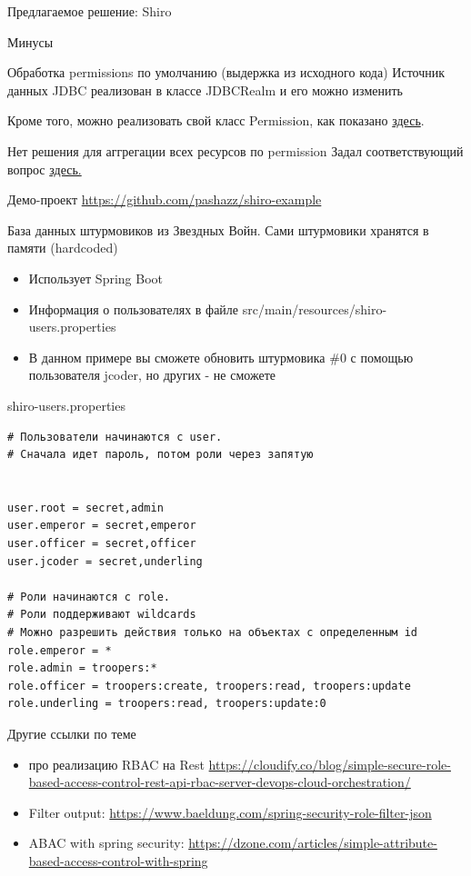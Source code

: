 \documentclass[presentation]{beamer}
\begin{document}
\begin{frame}[label={sec:org90289dd},fragile]{Предлагаемое решение: Shiro}
\begin{block}{Минусы}
\begin{block}{Обработка permissions по умолчанию (выдержка из исходного кода)}
Источник данных JDBC реализован в классе JDBCRealm и его можно изменить

Кроме того, можно реализовать свой класс Permission, как показано \href{https://www.baeldung.com/apache-shiro-access-control}{здесь}.
\end{block}

\begin{block}{Нет решения для аггрегации всех ресурсов по permission}
Задал соответствующий вопрос \href{http://shiro-user.582556.n2.nabble.com/Using-Shiro-for-permission-based-resource-lookup-td7582096.html}{здесь.}
\end{block}
\end{block}
\begin{block}{Демо-проект}
\url{https://github.com/pashazz/shiro-example}

База данных штурмовиков из Звездных Войн. Сами штурмовики хранятся в памяти (hardcoded)

\begin{itemize}
\item Использует Spring Boot
\item Информация о пользователях в файле src/main/resources/shiro-users.properties
\item В данном примере вы сможете обновить штурмовика \#0 с помощью пользователя jcoder, но других - не сможете
\end{itemize}

\begin{block}{shiro-users.properties}
\begin{verbatim}
# Пользователи начинаются с user.
# Сначала идет пароль, потом роли через запятую


user.root = secret,admin
user.emperor = secret,emperor
user.officer = secret,officer
user.jcoder = secret,underling

# Роли начинаются с role.
# Роли поддерживают wildcards
# Можно разрешить действия только на объектах с определенным id
role.emperor = *
role.admin = troopers:*
role.officer = troopers:create, troopers:read, troopers:update
role.underling = troopers:read, troopers:update:0
\end{verbatim}
\end{block}
\end{block}
\end{frame}

\begin{frame}[label={sec:orga905e3a}]{Другие ссылки по теме}
\begin{itemize}
\item про реализацию RBAC на Rest \url{https://cloudify.co/blog/simple-secure-role-based-access-control-rest-api-rbac-server-devops-cloud-orchestration/}
\item Filter output: \url{https://www.baeldung.com/spring-security-role-filter-json}
\item ABAC with spring security: \url{https://dzone.com/articles/simple-attribute-based-access-control-with-spring}
\end{itemize}
\end{frame}
\end{document}
